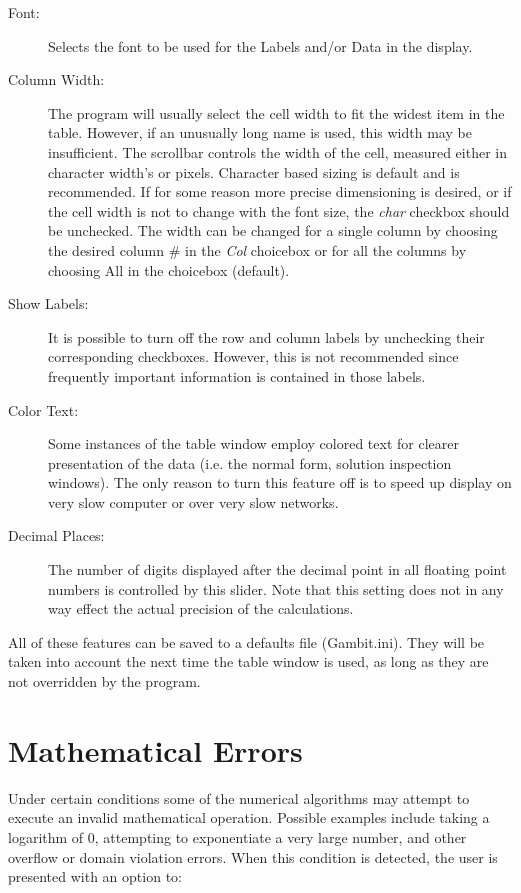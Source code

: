 \documentclass[12pt]{report}
\begin{document}
\begin{description}
\item[Font:] Selects the font to be used for the Labels and/or Data in
the display.
\item[Column Width:] The program will usually select the cell width to
fit the widest item in the table.  However, if an unusually long name
is used, this width may be insufficient.  The scrollbar controls the
width of the cell, measured either in character width's or pixels.
Character based sizing is default and is recommended.  If for some
reason more precise dimensioning is desired, or if the cell width is
not to change with the font size, the {\em char} checkbox should be
unchecked.  The width can be changed for a single column by choosing
the desired column \# in the {\em Col} choicebox or for all the
columns by choosing All in the choicebox (default).
\item[Show Labels:] It is possible to turn off the row and column
labels by unchecking their corresponding checkboxes.  However, this is
not recommended since frequently important information is contained in
those labels.
\item[Color Text:] Some instances of the table window employ colored
text for clearer presentation of the data (i.e. the normal form,
solution inspection windows).  The only reason to turn this feature
off is to speed up display on very slow computer or over very slow
networks.
\item[Decimal Places:] The number of digits displayed after the
decimal point in all floating point numbers is controlled by this
slider.  Note that this setting does not in any way effect the actual
precision of the calculations.
\end{description}

All of these features can be saved to a defaults file (Gambit.ini).  They
will be taken into account the next time the table window is used, as long
as they are not overridden by the program.

\section{Mathematical Errors}
Under certain conditions some of the numerical algorithms may attempt to
execute an invalid mathematical operation.  Possible examples include
taking a logarithm of 0, attempting to exponentiate a very large number, and
other overflow or domain violation errors.  When this condition is detected,
the user is presented with an option to:
\end{document}
